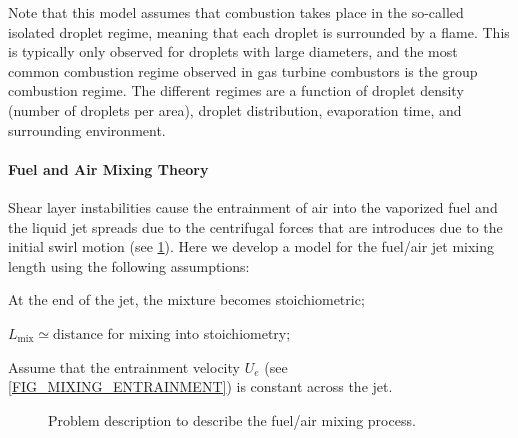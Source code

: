 Note that this model assumes that combustion takes place in the so-called isolated droplet regime, meaning that each droplet is surrounded by a flame. This is typically only observed for droplets with large diameters, and the most common combustion regime observed in gas turbine combustors is the group combustion regime. The different regimes are a function of droplet density (number of droplets per area), droplet distribution, evaporation time, and surrounding environment.
\paragraph{Fuel and Air Mixing Theory}
Shear layer instabilities cause the entrainment of air into the vaporized fuel and the liquid jet spreads due to the centrifugal forces that are introduces due to the initial swirl motion (see \cref{FIG_MIXING_SCHEMATIC_ENTRAINMENT}). Here we develop a model for the fuel/air jet mixing length using the following assumptions:
\begin{itemizePacked}
\item At the end of the jet, the mixture becomes stoichiometric;
\item $L_\text{mix} \simeq \text{distance}$ for mixing into stoichiometry;
\item Assume that the entrainment velocity $U_e$ (see \cref{FIG_MIXING_ENTRAINMENT}) is constant across the jet.
\end{itemizePacked}

\begin{figure}[!htb!]
 \centering
    \caption{\label{FIG_MIXING_SCHEMATIC_ENTRAINMENT}Problem description to describe the fuel/air mixing process.}
\end{figure}


